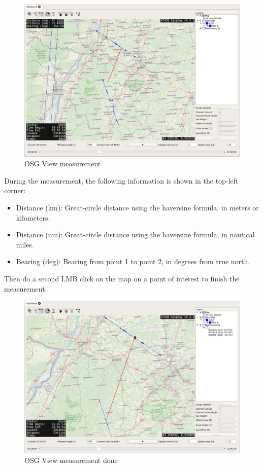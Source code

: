 {\begin{figure}[H]
    \hspace*{-2cm}
    \includegraphics[width=18cm,frame]{../screenshots/osgview_measure1.png}
  \caption{OSG View measurement}
\end{figure}

During the measurement, the following information is shown in the top-left corner:

\begin{itemize}
 \item Distance (km): Great-circle distance using the haversine formula, in meters or kilometers.
 \item Distance (nm): Great-circle distance using the haversine formula, in nautical miles.
 \item  Bearing (deg): Bearing from point 1 to point 2, in degrees from true north.
\end{itemize}

Then do a second LMB click on the map on a point of interest to finish the measurement.

\begin{figure}[H]
    \hspace*{-2cm}
    \includegraphics[width=18cm,frame]{../screenshots/osgview_measure2.png}
  \caption{OSG View measurement done}
\end{figure}

}
